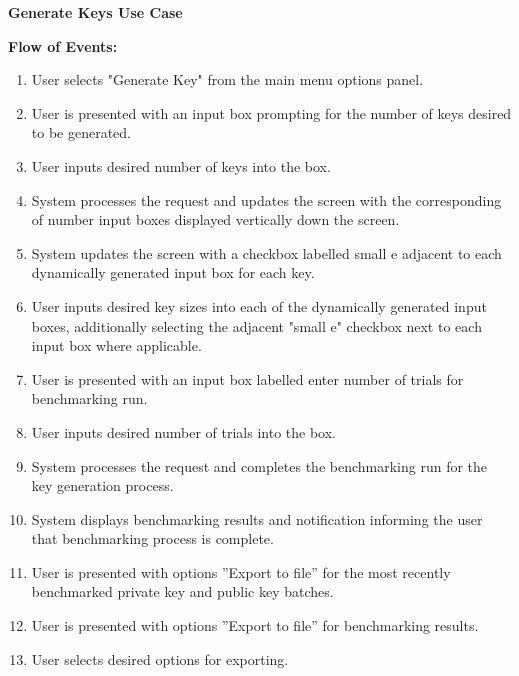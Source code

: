 \documentclass[]{final_report}
\theoremstyle{definition}
\begin{document}
\textbf{Generate Keys Use Case}

\noindent\textbf{Flow of Events:}
\begin{enumerate}
    \item User selects "Generate Key" from the main menu options panel.
    \item User is presented with an input box prompting for the number of keys desired to be generated.
    \item User inputs desired number of keys into the box.
    \item System processes the request and updates the screen with the corresponding of number input boxes displayed vertically down the screen.
    \item System updates the screen with a checkbox labelled small e adjacent to each dynamically generated input box for each key.
    \item User inputs desired key sizes into each of the dynamically generated input boxes, additionally selecting the adjacent "small e" checkbox next to each input box where applicable.
    \item User is presented with an input box labelled enter number of trials for benchmarking run.
    \item User inputs desired number of trials into the box.
    \item System processes the request and completes the benchmarking run for the key generation process.
      \item System displays benchmarking results and notification informing the user that benchmarking process is complete.
      \item User is presented with options ”Export to file” for the most recently benchmarked private key and public key batches.
        \item User is presented with options ”Export to file” for benchmarking results.
        \item User selects desired options for exporting.
\end{enumerate}
\end{document}
